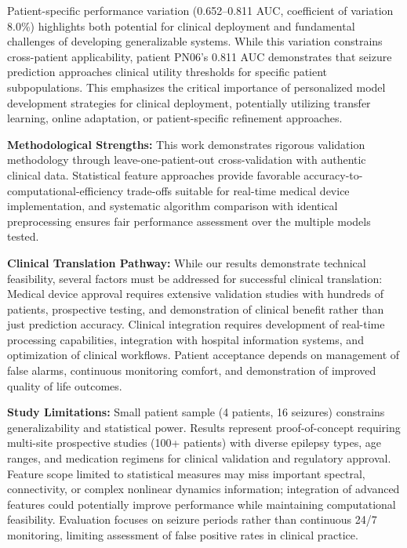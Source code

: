 \documentclass[conference]{IEEEtran}
\begin{document}
Patient-specific performance variation (0.652--0.811 AUC, coefficient of variation 8.0\%) highlights both potential for clinical deployment and fundamental challenges of developing generalizable systems. While this variation constrains cross-patient applicability, patient PN06's 0.811 AUC demonstrates that seizure prediction approaches clinical utility thresholds for specific patient subpopulations. This emphasizes the critical importance of personalized model development strategies for clinical deployment, potentially utilizing transfer learning, online adaptation, or patient-specific refinement approaches.

\textbf{Methodological Strengths:} This work demonstrates rigorous validation methodology through leave-one-patient-out cross-validation with authentic clinical data. Statistical feature approaches provide favorable accuracy-to-computational-efficiency trade-offs suitable for real-time medical device implementation, and systematic algorithm comparison with identical preprocessing ensures fair performance assessment over the multiple models tested.

\textbf{Clinical Translation Pathway:} While our results demonstrate technical feasibility, several factors must be addressed for successful clinical translation: Medical device approval requires extensive validation studies with hundreds of patients, prospective testing, and demonstration of clinical benefit rather than just prediction accuracy. Clinical integration requires development of real-time processing capabilities, integration with hospital information systems, and optimization of clinical workflows. Patient acceptance depends on management of false alarms, continuous monitoring comfort, and demonstration of improved quality of life outcomes.

\textbf{Study Limitations:} Small patient sample (4 patients, 16 seizures) constrains generalizability and statistical power. Results represent proof-of-concept requiring multi-site prospective studies (100+ patients) with diverse epilepsy types, age ranges, and medication regimens for clinical validation and regulatory approval. Feature scope limited to statistical measures may miss important spectral, connectivity, or complex nonlinear dynamics information; integration of advanced features could potentially improve performance while maintaining computational feasibility. Evaluation focuses on seizure periods rather than continuous 24/7 monitoring, limiting assessment of false positive rates in clinical practice.
\end{document}

